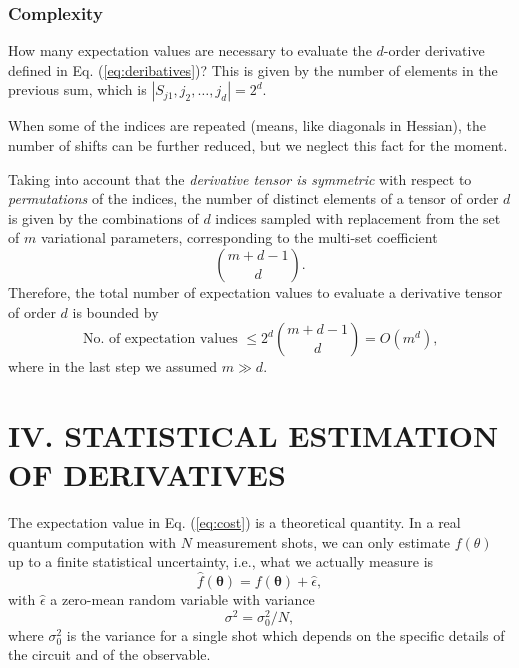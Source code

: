 \subsubsection{Complexity}

How many expectation values are necessary to evaluate the $d$-order derivative defined in Eq. (\ref{eq:deribatives})? This is given by the number of elements in the previous sum, which is $\left|S_{j 1}, j_2, \ldots, j_d\right|=2^d$. 

When some of the indices are repeated (means, like diagonals in Hessian), the number of shifts can be further reduced, but we neglect this fact for the moment. 

Taking into account that the \textit{derivative tensor is symmetric} with respect to \textit{permutations} of the indices, the number of distinct elements of a tensor of order $d$ is given by the combinations of $d$ indices sampled with replacement from the set of $m$ variational parameters, corresponding to the multi-set coefficient
\begin{equation}
    \binom{m+d-1}{d}.
\end{equation}
Therefore, the total number of expectation values to evaluate a derivative tensor of order $d$ is bounded by
\begin{equation}
    \text { No. of expectation values } \leqslant 2^d\binom{m+d-1}{d}=O\left(m^d\right) \text {, }
\end{equation}
where in the last step we assumed $m \gg d$.

\section{IV. STATISTICAL ESTIMATION OF DERIVATIVES}

The expectation value in Eq. (\ref{eq:cost}) is a theoretical quantity. In a real quantum computation with $N$ measurement shots, we can only estimate $f(\theta)$ up to a finite statistical uncertainty, i.e., what we actually measure is
\begin{equation}\label{eq:25}
    \hat{f}(\boldsymbol{\theta})=f(\boldsymbol{\theta})+\hat{\epsilon},
\end{equation}
with $\hat{\epsilon}$ a zero-mean random variable with variance
\begin{equation}
    \sigma^2=\sigma_0^2 / N,
\end{equation}
where $\sigma_0^2$ is the variance for a single shot which depends on the specific details of the circuit and of the observable. 

